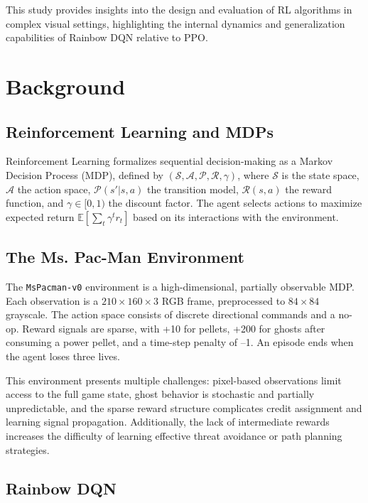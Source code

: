 \documentclass{article}
\begin{document}
This study provides insights into the design and evaluation of RL algorithms in complex visual settings, highlighting the internal dynamics and generalization capabilities of Rainbow DQN relative to PPO.

\section{Background}

\subsection{Reinforcement Learning and MDPs}

Reinforcement Learning formalizes sequential decision-making as a Markov Decision Process (MDP), defined by $(\mathcal{S}, \mathcal{A}, \mathcal{P}, \mathcal{R}, \gamma)$, where $\mathcal{S}$ is the state space, $\mathcal{A}$ the action space, $\mathcal{P}(s'|s,a)$ the transition model, $\mathcal{R}(s,a)$ the reward function, and $\gamma \in [0,1)$ the discount factor. The agent selects actions to maximize expected return $\mathbb{E}[\sum_t \gamma^t r_t]$ based on its interactions with the environment.

\subsection{The Ms. Pac-Man Environment}

The \texttt{MsPacman-v0} environment is a high-dimensional, partially observable MDP. Each observation is a $210 \times 160 \times 3$ RGB frame, preprocessed to $84 \times 84$ grayscale. The action space consists of discrete directional commands and a no-op. Reward signals are sparse, with +10 for pellets, +200 for ghosts after consuming a power pellet, and a time-step penalty of –1. An episode ends when the agent loses three lives.

This environment presents multiple challenges: pixel-based observations limit access to the full game state, ghost behavior is stochastic and partially unpredictable, and the sparse reward structure complicates credit assignment and learning signal propagation. Additionally, the lack of intermediate rewards increases the difficulty of learning effective threat avoidance or path planning strategies.

\subsection{Rainbow DQN}
\end{document}
